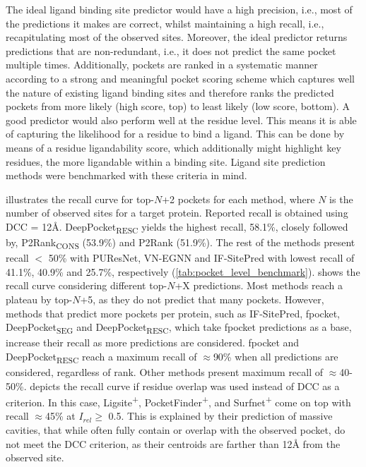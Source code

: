 The ideal ligand binding site predictor would have a high precision, i.e., most of the predictions it makes are correct, whilst maintaining a high recall, i.e., recapitulating most of the observed sites. Moreover, the ideal predictor returns predictions that are non-redundant, i.e., it does not predict the same pocket multiple times. Additionally, pockets are ranked in a systematic manner according to a strong and meaningful pocket scoring scheme which captures well the nature of existing ligand binding sites and therefore ranks the predicted pockets from more likely (high score, top) to least likely (low score, bottom). A good predictor would also perform well at the residue level. This means it is able of capturing the likelihood for a residue to bind a ligand. This can be done by means of a residue ligandability score, which additionally might highlight key residues, the more ligandable within a binding site. Ligand site prediction methods were benchmarked with these criteria in mind.

 illustrates the recall curve for top-$N$+2 pockets for each method, where $N$ is the number of observed sites for a target protein. Reported recall is obtained using DCC = 12\AA{}. DeepPocket\textsubscript{RESC} yields the highest recall, 58.1\%, closely followed by, P2Rank\textsubscript{CONS} (53.9\%) and P2Rank (51.9\%). The rest of the methods present recall $<$ 50\% with PUResNet, VN-EGNN and IF-SitePred with lowest recall of 41.1\%, 40.9\% and 25.7\%, respectively (\autoref{tab:pocket_level_benchmark}).  shows the recall curve considering different top-$N$+X predictions. Most methods reach a plateau by top-$N$+5, as they do not predict that many pockets. However, methods that predict more pockets per protein, such as IF-SitePred, fpocket, DeepPocket\textsubscript{SEG} and DeepPocket\textsubscript{RESC}, which take fpocket predictions as a base, increase their recall as more predictions are considered. fpocket and DeepPocket\textsubscript{RESC} reach a maximum recall of $\approx$90\% when all predictions are considered, regardless of rank. Other methods present maximum recall of $\approx$40-50\%.  depicts the recall curve if residue overlap was used instead of DCC as a criterion. In this case, Ligsite\textsuperscript{+}, PocketFinder\textsuperscript{+}, and Surfnet\textsuperscript{+} come on top with recall $\approx$45\% at $I_{rel} \geq$ 0.5. This is explained by their prediction of massive cavities, that while often fully contain or overlap with the observed pocket, do not meet the DCC criterion, as their centroids are farther than 12\AA{} from the observed site.

